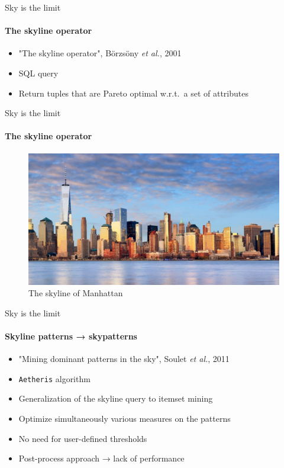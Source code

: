 \documentclass{beamer}
\newcommand{\etal}{\emph{et al.}}
\newcommand{\aeth}{\texttt{Aetheris}}
\begin{document}
\begin{frame}{Sky is the limit}
  \framesubtitle{The skyline operator}
  \begin{itemize}
  \item "The skyline operator", Börzsöny \etal{}, 2001
  \item SQL query
  \item Return tuples that are Pareto optimal w.r.t.\ a set of attributes
  \end{itemize}
\end{frame}

\begin{frame}{Sky is the limit}
  \framesubtitle{The skyline operator}
  \begin{figure}[htp]
  \centering
  \includegraphics[width=\textwidth]{manhattan.jpg}
  \caption{The skyline of Manhattan}
  \end{figure} 
\end{frame}

\begin{frame}{Sky is the limit}
  \framesubtitle{Skyline patterns → skypatterns}
  \begin{itemize}
  \item "Mining dominant patterns in the sky", Soulet \etal{}, 2011
  \item \aeth{} algorithm
  \item Generalization of the skyline query to itemset mining
  \pause
  \item Optimize simultaneously various measures on the patterns
  \item No need for user-defined thresholds
  \pause
  \item Post-process approach → lack of performance
  \end{itemize}
\end{frame}
\end{document}
